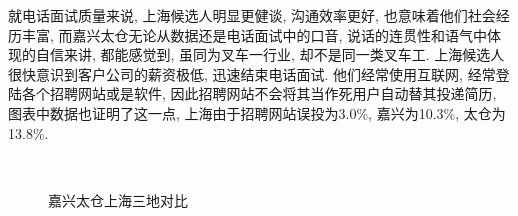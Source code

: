 就电话面试质量来说, 上海候选人明显更健谈, 沟通效率更好, 也意味着他们社会经历丰富, 而嘉兴太仓无论从数据还是电话面试中的口音, 说话的连贯性和语气中体现的自信来讲, 都能感觉到, 虽同为叉车一行业, 却不是同一类叉车工. 上海候选人很快意识到客户公司的薪资极低, 迅速结束电话面试. 他们经常使用互联网, 经常登陆各个招聘网站或是软件, 因此招聘网站不会将其当作死用户自动替其投递简历, 图表中数据也证明了这一点, 上海由于招聘网站误投为3.0\%, 嘉兴为10.3\%, 太仓为13.8\%. 

\begin{figure}[!htbp]
    \centering
    \qquad
    \\[12pt]
    \caption{嘉兴太仓上海三地对比}
    \label{fig:0304}
\end{figure}

